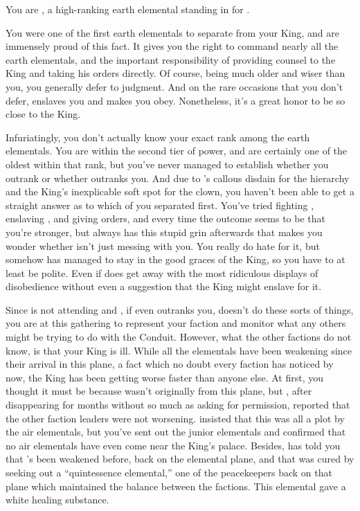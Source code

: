 \documentclass[char]{elementals}
\begin{document}
\name{\cLoyal{}}

You are \cLoyal{\intro}, a high-ranking earth elemental standing in for \cEarthKing{}.

You were one of the first earth elementals to separate from your King, and are immensely proud of this fact.  It gives you the right to command nearly all the earth elementals, and the important responsibility of providing counsel to the King and taking his orders directly.  Of course, \cEarthKing{\they} being much older and wiser than you, you generally defer to \cEarthKing{\their} judgment.  And on the rare occasions that you don't defer, \cEarthKing{\they} enslaves you and makes you obey.  Nonetheless, it's a great honor to be so close to the King.

Infuriatingly, you don't actually know your exact rank among the earth elementals.  You are within the second tier of power, and are certainly one of the oldest within that rank, but you've never managed to establish whether you outrank \cRogue{\intro} or whether \cRogue{\they} outranks you.  And due to \cRogue{}'s callous disdain for the hierarchy and the King's inexplicable soft spot for the clown, you haven't been able to get a straight answer as to which of you separated first.  You've tried fighting \cRogue{}, enslaving \cRogue{\them}, and giving \cRogue{\them} orders, and every time the outcome seems to be that you're stronger, but \cRogue{\they} always has this stupid grin afterwards that makes you wonder whether \cRogue{\they} isn't just messing with you.  You really do hate \cRogue{\them} for it, but somehow \cRogue{\they} has managed to stay in the good graces of the King, so you have to at least be polite.  Even if \cRogue{\they} does get away with the most ridiculous displays of disobedience without even a suggestion that the King might enslave \cRogue{\them} for it.

Since \cEarthKing{} is not attending and \cRogue{}, if \cRogue{\they} even outranks you, doesn't do these sorts of things, you are at this gathering to represent your faction and monitor what any others might be trying to do with the Conduit.  However, what the other factions do not know, is that your King is ill.  While all the elementals have been weakening since their arrival in this plane, a fact which no doubt every faction has noticed by now, the King has been getting worse faster than anyone else.  At first, you thought it must be because \cEarthKing{} wasn't originally from this plane, but \cRogue{}, after disappearing for months without so much as asking for permission, reported that the other faction leaders were not worsening.  \cRogue{\they} insisted that this was all a plot by the air elementals, but you've sent out the junior elementals and confirmed that no air elementals have even come near the King's palace.  Besides, \cEarthKing{} has told you that \cEarthKing{\they}'s been weakened before, back on the elemental plane, and that \cEarthKing{\they} was cured by seeking out a ``quintessence elemental,'' one of the peacekeepers back on that plane which maintained the balance between the factions.  This elemental gave \cEarthKing{\them} a white healing substance.  
\end{document}
